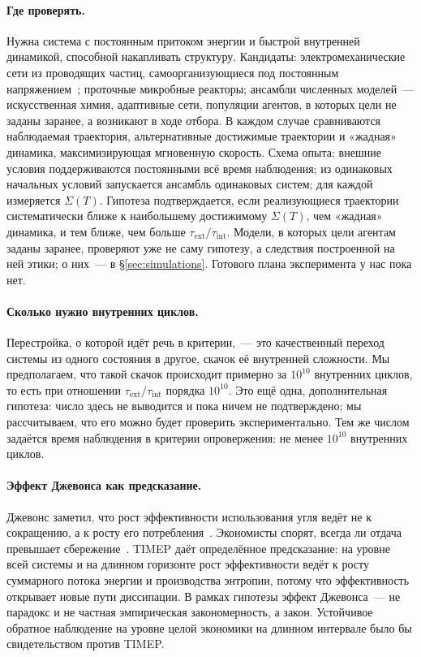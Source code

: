 \documentclass[11pt,a4paper]{article}
\newcommand{\Sref}[1]{\hyperref[#1]{\S\ref{#1}}}
\begin{document}
\paragraph{Где проверять.}
Нужна система с постоянным притоком энергии и быстрой внутренней динамикой, способной накапливать структуру. Кандидаты: электромеханические сети из проводящих частиц, самоорганизующиеся под постоянным напряжением~\cite{jun2005}; проточные микробные реакторы; ансамбли численных моделей~--- искусственная химия, адаптивные сети, популяции агентов, в которых цели не заданы заранее, а возникают в ходе отбора. В каждом случае сравниваются наблюдаемая траектория, альтернативные достижимые траектории и «жадная» динамика, максимизирующая мгновенную скорость. Схема опыта: внешние условия поддерживаются постоянными всё время наблюдения; из одинаковых начальных условий запускается ансамбль одинаковых систем; для каждой измеряется $\Sigma(T)$. Гипотеза подтверждается, если реализующиеся траектории систематически ближе к наибольшему достижимому $\Sigma(T)$, чем «жадная» динамика, и тем ближе, чем больше $\tau_{\mathrm{ext}}/\tau_{\mathrm{int}}$. Модели, в которых цели агентам заданы заранее, проверяют уже не саму гипотезу, а следствия построенной на ней этики; о них~--- в \Sref{sec:simulations}. Готового плана эксперимента у нас пока нет.

\paragraph{Сколько нужно внутренних циклов.}
Перестройка, о которой идёт речь в критерии,~--- это качественный переход системы из одного состояния в другое, скачок её внутренней сложности. Мы предполагаем, что такой скачок происходит примерно за $10^{10}$ внутренних циклов, то есть при отношении $\tau_{\mathrm{ext}}/\tau_{\mathrm{int}}$ порядка $10^{10}$. Это ещё одна, дополнительная гипотеза: число здесь не выводится и пока ничем не подтверждено; мы рассчитываем, что его можно будет проверить экспериментально. Тем же числом задаётся время наблюдения в критерии опровержения: не менее $10^{10}$ внутренних циклов.

\paragraph{Эффект Джевонса как предсказание.}
Джевонс заметил, что рост эффективности использования угля ведёт не к сокращению, а к росту его потребления~\cite{jevons1865}. Экономисты спорят, всегда ли отдача превышает сбережение~\cite{alcott2005,sorrell2009}. TIMEP даёт определённое предсказание: на уровне всей системы и на длинном горизонте рост эффективности ведёт к росту суммарного потока энергии и производства энтропии, потому что эффективность открывает новые пути диссипации. В рамках гипотезы эффект Джевонса~--- не парадокс и не частная эмпирическая закономерность, а закон. Устойчивое обратное наблюдение на уровне целой экономики на длинном интервале было бы свидетельством против TIMEP.
\end{document}
